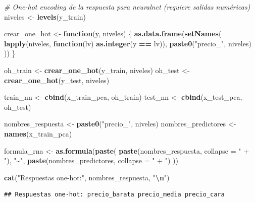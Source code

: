 \documentclass[
]{article}
\newenvironment{Shaded}{\begin{snugshade}}{\end{snugshade}}
\newcommand{\AttributeTok}[1]{\textcolor[rgb]{0.13,0.29,0.53}{#1}}
\newcommand{\CommentTok}[1]{\textcolor[rgb]{0.56,0.35,0.01}{\textit{#1}}}
\newcommand{\ControlFlowTok}[1]{\textcolor[rgb]{0.13,0.29,0.53}{\textbf{#1}}}
\newcommand{\FunctionTok}[1]{\textcolor[rgb]{0.13,0.29,0.53}{\textbf{#1}}}
\newcommand{\NormalTok}[1]{#1}
\newcommand{\OtherTok}[1]{\textcolor[rgb]{0.56,0.35,0.01}{#1}}
\newcommand{\SpecialCharTok}[1]{\textcolor[rgb]{0.81,0.36,0.00}{\textbf{#1}}}
\newcommand{\StringTok}[1]{\textcolor[rgb]{0.31,0.60,0.02}{#1}}
\begin{document}
\begin{Shaded}
\begin{Highlighting}[]
\CommentTok{\# One{-}hot encoding de la respuesta para neuralnet (requiere salidas numéricas)}
\NormalTok{niveles }\OtherTok{\textless{}{-}} \FunctionTok{levels}\NormalTok{(y\_train)}

\NormalTok{crear\_one\_hot }\OtherTok{\textless{}{-}} \ControlFlowTok{function}\NormalTok{(y, niveles) \{}
  \FunctionTok{as.data.frame}\NormalTok{(}\FunctionTok{setNames}\NormalTok{(}
    \FunctionTok{lapply}\NormalTok{(niveles, }\ControlFlowTok{function}\NormalTok{(lv) }\FunctionTok{as.integer}\NormalTok{(y }\SpecialCharTok{==}\NormalTok{ lv)),}
    \FunctionTok{paste0}\NormalTok{(}\StringTok{"precio\_"}\NormalTok{, niveles)}
\NormalTok{  ))}
\NormalTok{\}}

\NormalTok{oh\_train }\OtherTok{\textless{}{-}} \FunctionTok{crear\_one\_hot}\NormalTok{(y\_train, niveles)}
\NormalTok{oh\_test  }\OtherTok{\textless{}{-}} \FunctionTok{crear\_one\_hot}\NormalTok{(y\_test,  niveles)}

\NormalTok{train\_nn }\OtherTok{\textless{}{-}} \FunctionTok{cbind}\NormalTok{(x\_train\_pca, oh\_train)}
\NormalTok{test\_nn  }\OtherTok{\textless{}{-}} \FunctionTok{cbind}\NormalTok{(x\_test\_pca,  oh\_test)}

\NormalTok{nombres\_respuesta   }\OtherTok{\textless{}{-}} \FunctionTok{paste0}\NormalTok{(}\StringTok{"precio\_"}\NormalTok{, niveles)}
\NormalTok{nombres\_predictores }\OtherTok{\textless{}{-}} \FunctionTok{names}\NormalTok{(x\_train\_pca)}

\NormalTok{formula\_rna }\OtherTok{\textless{}{-}} \FunctionTok{as.formula}\NormalTok{(}\FunctionTok{paste}\NormalTok{(}
  \FunctionTok{paste}\NormalTok{(nombres\_respuesta, }\AttributeTok{collapse =} \StringTok{" + "}\NormalTok{),}
  \StringTok{"\textasciitilde{}"}\NormalTok{,}
  \FunctionTok{paste}\NormalTok{(nombres\_predictores, }\AttributeTok{collapse =} \StringTok{" + "}\NormalTok{)}
\NormalTok{))}

\FunctionTok{cat}\NormalTok{(}\StringTok{"Respuestas one{-}hot:"}\NormalTok{, nombres\_respuesta, }\StringTok{"}\SpecialCharTok{\textbackslash{}n}\StringTok{"}\NormalTok{)}
\end{Highlighting}
\end{Shaded}

\begin{verbatim}
## Respuestas one-hot: precio_barata precio_media precio_cara
\end{verbatim}
\end{document}
